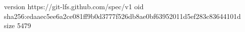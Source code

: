 version https://git-lfs.github.com/spec/v1
oid sha256:edaaec5ee6a2ce081ff9b0d3777f526db8ae0bf63952011d5ef283c83644101d
size 5479

